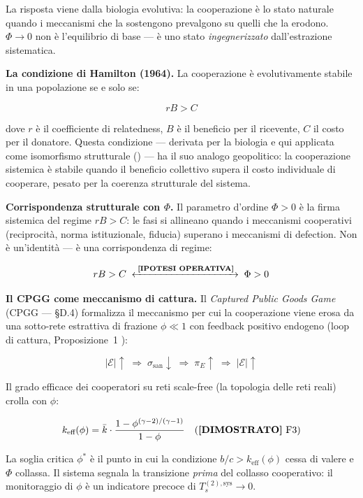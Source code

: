 La risposta viene dalla biologia evolutiva: la cooperazione è lo stato
naturale quando i meccanismi che la sostengono prevalgono su quelli che
la erodono. \(\Phi \to 0\) non è l'equilibrio di base --- è uno stato
\emph{ingegnerizzato} dall'estrazione sistematica.

\Proved{} \textbf{La condizione di Hamilton (1964).} La cooperazione è
evolutivamente stabile in una popolazione se e solo se:

\[
rB > C \tag{H}
\]

dove \(r\) è il coefficiente di relatedness, \(B\) è il beneficio per il
ricevente, \(C\) il costo per il donatore. Questa condizione --- derivata
per la biologia e qui applicata come isomorfismo strutturale (\Hypoth{}) ---
ha il suo analogo geopolitico: la cooperazione sistemica è stabile quando
il beneficio collettivo supera il costo individuale di cooperare, pesato
per la coerenza strutturale del sistema.

\Hypoth{} \textbf{Corrispondenza strutturale con \(\Phi\).}
Il parametro d'ordine \(\Phi > 0\) è la firma sistemica del regime
\(rB > C\): le fasi si allineano quando i meccanismi cooperativi
(reciprocità, norma istituzionale, fiducia) superano i meccanismi di
defection. Non è un'identità --- è una corrispondenza di regime:

\[
rB > C \;\xleftrightarrow{\;\text{\textnormal{\textbf{[IPOTESI OPERATIVA]}}{}}\;}\; \Phi > 0
\]

\Hypoth{} \textbf{Il CPGG come meccanismo di cattura.} Il
\textit{Captured Public Goods Game} (CPGG --- §D.4) formalizza il
meccanismo per cui la cooperazione viene erosa da una sotto-rete
estrattiva di frazione \(\phi \ll 1\) con feedback positivo endogeno
(loop di cattura, Proposizione~1 \Proved{}):

\[
|\mathcal{E}| \uparrow \;\Rightarrow\; \sigma_{\text{san}} \downarrow \;\Rightarrow\; \pi_E \uparrow \;\Rightarrow\; |\mathcal{E}| \uparrow
\]

Il grado efficace dei cooperatori su reti scale-free (la topologia delle
reti reali) crolla con \(\phi\):

\[
k_{\text{eff}}(\phi) = \bar{k} \cdot \frac{1 - \phi^{(\gamma-2)/(\gamma-1)}}{1-\phi} \quad (\text{\textnormal{\textbf{[DIMOSTRATO]}}{} F3})
\]

La soglia critica \(\phi^*\) è il punto in cui la condizione
\(b/c > k_{\text{eff}}(\phi)\) cessa di valere e \(\Phi\) collassa. Il
sistema segnala la transizione \emph{prima} del collasso cooperativo:
il monitoraggio di \(\phi\) è un indicatore precoce di
\(T_s^{(2),\text{sys}} \to 0\).

